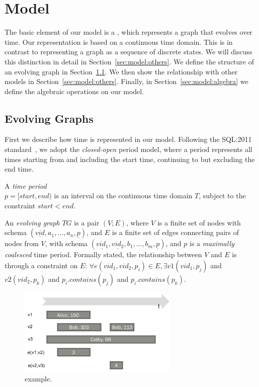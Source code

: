 \section{Model}
\label{sec:model}

The basic element of our model is a \tg, which represents a graph that
evolves over time.  Our representation is based on a continuous time
domain.  This is in contrast to representing a graph as a sequence of
discrete states. We will discuss this distinction in detail in
Section~\ref{sec:model:others}.  We define the structure of an
evolving graph in Section~\ref{sec:model:structure}.  We then show the
relationship with other models in Section~\ref{sec:model:others}.
Finally, in Section~\ref{sec:model:algebra} we define the algebraic
operations on our model.

\subsection{Evolving Graphs}
\label{sec:model:structure}

First we describe how time is represented in our model.  Following the
SQL:2011 standard~\cite{DBLP:journals/sigmod/KulkarniM12}, we adopt
the {\em closed-open} period model, where a period represents all
times starting from and including the start time, continuing to but
excluding the end time.

\begin{definition}
A {\em time period} \\$p = [start, end)$ is an interval on the
  continuous time domain $T$, subject to the constraint $start < end$.
\label{def:period} 
\end{definition}

\begin{definition}[TGraph]
An {\em evolving graph} $TG$ is a pair $(V;E)$, where $V$ is a finite
set of nodes with schema $(\underline{vid}, a_1, \ldots, a_n,
\underline{p})$, and $E$ is a finite set of edges connecting pairs of
nodes from $V$, with schema $(\underline{vid_1}, \underline{vid_2},
b_1, \ldots, b_m, \underline{p})$, and $p$ is a {\em maximally
  coalesced} time period.  Formally stated, the relationship between
$V$ and $E$ is through a constraint on $E$: $\forall e(vid_1, vid_2,
p_i) \in E, \exists v1(vid_1, p_j)$ and $v2(vid_2, p_k)$ and
$p_i.contains(p_j)$ and $p_i.contains(p_k)$.
\label{def:tg}
\end{definition}

\begin{figure}
\includegraphics[width=3in]{figs/T1.pdf}
\caption{\tg {} example.}
\label{fig:tg}
\end{figure}

